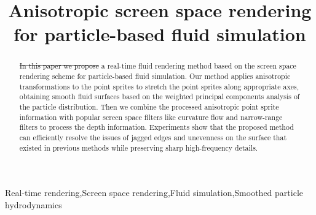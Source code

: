 \documentclass[times,twocolumn,final]{elsarticle}
\providecommand{\DIFaddtex}[1]{{\protect\color{blue}\uwave{#1}}} %
\providecommand{\DIFdeltex}[1]{{\protect\color{red}\sout{#1}}}                      %
\providecommand{\DIFaddbegin}{} %
\providecommand{\DIFaddend}{} %
\providecommand{\DIFdelbegin}{} %
\providecommand{\DIFdelend}{} %
\providecommand{\DIFadd}[1]{\texorpdfstring{\DIFaddtex{#1}}{#1}} %
\providecommand{\DIFdel}[1]{\texorpdfstring{\DIFdeltex{#1}}{}} %
\begin{document}

\begin{frontmatter}

\title{Anisotropic screen space rendering for particle-based fluid simulation
}%

\author{}



\received{\today}


\begin{abstract}
\DIFdelbegin \DIFdel{In this paper we propose }\DIFdelend \DIFaddbegin \DIFadd{This paper proposes }\DIFaddend a real-time fluid rendering method based on the screen space rendering scheme for particle-based fluid simulation. Our method applies anisotropic transformations to the point sprites to stretch the point sprites along appropriate axes, obtaining smooth fluid surfaces based on the weighted principal components analysis of the particle distribution. Then we combine the processed anisotropic point sprite information with popular screen space filters like curvature flow and narrow-range filters to process the depth information. Experiments show that the proposed method can efficiently resolve the issues of jagged edges and unevenness on the surface that existed in previous methods while preserving sharp high-frequency details.
\end{abstract}

\begin{keyword}
\KWD Real-time rendering\sep Screen space rendering\sep Fluid simulation\sep Smoothed particle hydrodynamics
\end{keyword}

\end{frontmatter}
\end{document}
